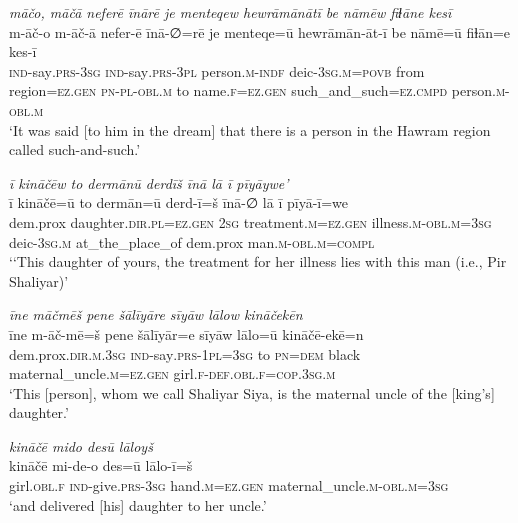 \ea \label{ZP.31}
\textit{māčo, māčā neferē īnārē je menteqew hewrāmānātī be nāmēw fiɫāne kesī} \\ 
\gll m-āč-o m-āč-ā nefer-ē īnā-∅=rē je menteqe=ū hewrāmān-āt-ī be nāmē=ū fiɫān=e kes-ī \\ 
 \textsc{ind-}say\textsc{.prs}\textsc{-3sg} \textsc{ind-}say\textsc{.prs}\textsc{-3pl} person\textsc{.m}\textsc{-indf} deic\textsc{-3sg}\textsc{.m}\textsc{=\textsc{povb}} from region\textsc{\textsc{=ez.gen}} \textsc{pn}\textsc{\textsc{-pl}}\textsc{-obl}\textsc{.m} to name\textsc{.f}\textsc{\textsc{=ez.gen}} such\_and\_such\textsc{=ez}\textsc{.cmpd} person\textsc{.m}\textsc{-obl}\textsc{.m} \\ 
\glt `It was said [to him in the dream] that there is a person in the Hawram region called such-and-such.'
\z 
 
\ea \label{ZP.33}
\textit{ī kināčēw to dermānū derdīš īnā lā ī pīyāywe’} \\ 
\gll ī kināčē=ū to dermān=ū derd-ī=š īnā-∅ lā ī pīyā-ī=we \\ 
 dem.prox daughter\textsc{.dir}\textsc{.pl}\textsc{\textsc{=ez.gen}} \textsc{2sg} treatment\textsc{.m}\textsc{\textsc{=ez.gen}} illness\textsc{.m}\textsc{-obl}\textsc{.m}\textsc{=3sg} deic\textsc{-3sg}\textsc{.m} at\_the\_place\_of dem.prox man\textsc{.m}\textsc{-obl}\textsc{.m}\textsc{=compl} \\ 
\glt `‘This daughter of yours, the treatment for her illness lies with this man (i.e., Pir Shaliyar)'
\z 
 
\ea \label{ZP.36}
\textit{īne māčmēš pene šālīyāre sīyāw lālow kināčekēn} \\ 
\gll īne m-āč-mē=š pene šālīyār=e sīyāw lālo=ū kināčē-ekē=n \\ 
 dem.prox\textsc{.dir}\textsc{.m}\textsc{.3sg} \textsc{ind-}say\textsc{.prs}\textsc{-1pl}\textsc{=3sg} to \textsc{pn}\textsc{=dem} black maternal\_uncle\textsc{.m}\textsc{\textsc{=ez.gen}} girl\textsc{.f}\textsc{-def}\textsc{.obl}\textsc{.f}\textsc{=cop}\textsc{.3sg}\textsc{.m} \\ 
\glt `This [person], whom we call Shaliyar Siya, is the maternal uncle of the [king’s] daughter.'
\z 
 
\ea \label{ZP.38}
\textit{kināčē mido desū lāloyš} \\ 
\gll kināčē mi-de-o des=ū lālo-ī=š \\ 
 girl\textsc{.obl}\textsc{.f} \textsc{ind-}give\textsc{.prs}\textsc{-3sg} hand\textsc{.m}\textsc{\textsc{=ez.gen}} maternal\_uncle\textsc{.m}\textsc{-obl}\textsc{.m}\textsc{=3sg} \\ 
\glt `and delivered [his] daughter to her uncle.'
\z 
 
